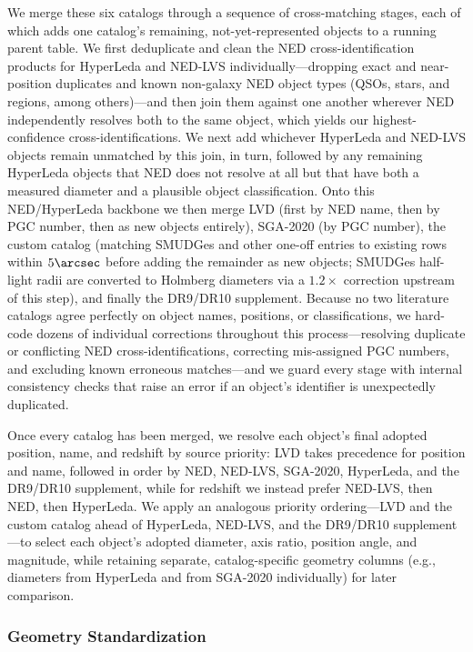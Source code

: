 \documentclass[modern,linenumbers]{aastex701}
\begin{document}
We merge these six catalogs through a sequence of cross-matching stages,
each of which adds one catalog's remaining, not-yet-represented objects
to a running parent table. We first deduplicate and clean the NED
cross-identification products for HyperLeda and NED-LVS individually---dropping
exact and near-position duplicates and known non-galaxy NED
object types (QSOs, stars, and  regions, among others)---and
then join them against one another wherever NED independently resolves
both to the same object, which yields our highest-confidence
cross-identifications. We next add whichever HyperLeda and NED-LVS
objects remain unmatched by this join, in turn, followed by any
remaining HyperLeda objects that NED does not resolve at all but that
have both a measured diameter and a plausible object classification.
Onto this NED/HyperLeda backbone we then merge LVD (first by NED name,
then by PGC number, then as new objects entirely), SGA-2020 (by PGC
number), the custom catalog (matching SMUDGes and other one-off entries
to existing rows within $5\arcsec$ before adding the remainder as new
objects; SMUDGes half-light radii are converted to Holmberg diameters
via a $1.2\times$ correction upstream of this step), and finally the
DR9/DR10 supplement. Because no two literature catalogs agree
perfectly on object names, positions, or classifications, we hard-code
dozens of individual corrections throughout this process---resolving
duplicate or conflicting NED cross-identifications, correcting
mis-assigned PGC numbers, and excluding known erroneous matches---and
we guard every stage with internal consistency checks that raise an
error if an object's identifier is unexpectedly duplicated.

Once every catalog has been merged, we resolve each object's final
adopted position, name, and redshift by source priority: LVD takes
precedence for position and name, followed in order by NED, NED-LVS,
SGA-2020, HyperLeda, and the DR9/DR10 supplement, while for redshift we
instead prefer NED-LVS, then NED, then HyperLeda. We apply an
analogous priority ordering---LVD and the custom catalog ahead of
HyperLeda, NED-LVS, and the DR9/DR10 supplement---to select each
object's adopted diameter, axis ratio, position angle, and magnitude,
while retaining separate, catalog-specific geometry columns (e.g.,
diameters from HyperLeda and from SGA-2020 individually) for later
comparison.

\subsubsection{Geometry Standardization}
\label{sec:input:parent:geometry}
\end{document}
